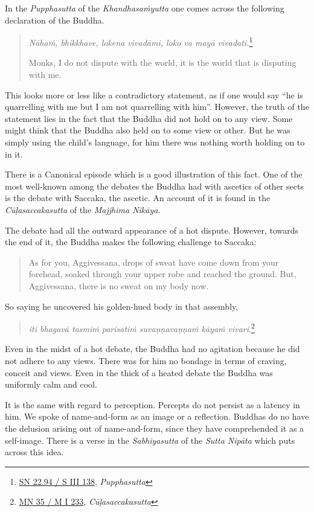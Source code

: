 In the \emph{Pupphasutta} of the \emph{Khandhasaṁyutta} one comes across the following declaration of the Buddha.

\begin{quote}
\emph{Nāhaṁ, bhikkhave, lokena vivadāmi, loko va mayā vivadati.}\footnote{\href{https://suttacentral.net/sn22.94/pli/ms}{SN 22.94 / S III 138}, \emph{Pupphasutta}}

Monks, I do not dispute with the world, it is the world that is disputing with me.
\end{quote}

This looks more or less like a contradictory statement, as if one would say ``he is quarrelling with me but I am not quarrelling with him''. However, the truth of the statement lies in the fact that the Buddha did not hold on to any view. Some might think that the Buddha also held on to some view or other. But he was simply using the child's language, for him there was nothing worth holding on to in it.

There is a Canonical episode which is a good illustration of this fact. One of the most well-known among the debates the Buddha had with ascetics of other sects is the debate with Saccaka, the ascetic. An account of it is found in the \emph{Cūḷasaccakasutta} of the \emph{Majjhima Nikāya}.

The debate had all the outward appearance of a hot dispute. However, towards the end of it, the Buddha makes the following challenge to Saccaka:

\begin{quote}
As for you, Aggivessana, drops of sweat have come down from your forehead, soaked through your upper robe and reached the ground. But, Aggivessana, there is no sweat on my body now.
\end{quote}

So saying he uncovered his golden-hued body in that assembly,

\begin{quote}
\emph{iti bhagavā tasmiṁ parisatiṁ suvaṇṇavaṇṇaṁ kāyaṁ vivari}.\footnote{\href{https://suttacentral.net/mn35/pli/ms}{MN 35 / M I 233}, \emph{Cūḷasaccakasutta}}
\end{quote}

Even in the midst of a hot debate, the Buddha had no agitation because he did not adhere to any views. There was for him no bondage in terms of craving, conceit and views. Even in the thick of a heated debate the Buddha was uniformly calm and cool.

It is the same with regard to perception. Percepts do not persist as a latency in him. We spoke of name-and-form as an image or a reflection. Buddhas do no have the delusion arising out of name-and-form, since they have comprehended it as a self-image. There is a verse in the \emph{Sabhiyasutta} of the \emph{Sutta Nipāta} which puts across this idea.

